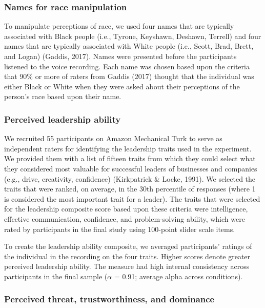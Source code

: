 \documentclass[
  english,
  man, noextraspace,floatsintext]{apa6}
\begin{document}
\hypertarget{names-for-race-manipulation}{%
\subsubsection{Names for race manipulation}\label{names-for-race-manipulation}}

To manipulate perceptions of race, we used four names that are typically associated with Black people (i.e., Tyrone, Keyshawn, Deshawn, Terrell) and four names that are typically associated with White people (i.e., Scott, Brad, Brett, and Logan) (Gaddis, 2017). Names were presented before the participants listened to the voice recording. Each name was chosen based upon the criteria that 90\% or more of raters from Gaddis (2017) thought that the individual was either Black or White when they were asked about their perceptions of the person's race based upon their name.

\hypertarget{perceived-leadership-ability}{%
\subsubsection{Perceived leadership ability}\label{perceived-leadership-ability}}

We recruited 55 participants on Amazon Mechanical Turk to serve as independent raters for identifying the leadership traits used in the experiment. We provided them with a list of fifteen traits from which they could select what they considered most valuable for successful leaders of businesses and companies (e.g., drive, creativity, confidence) (Kirkpatrick \& Locke, 1991). We selected the traits that were ranked, on average, in the 30th percentile of responses (where 1 is considered the most important trait for a leader). The traits that were selected for the leadership composite score based upon these criteria were intelligence, effective communication, confidence, and problem-solving ability, which were rated by participants in the final study using 100-point slider scale items.

To create the leadership ability composite, we averaged participants' ratings of the individual in the recording on the four traits. Higher scores denote greater perceived leadership ability. The measure had high internal consistency across participants in the final sample (\(\alpha\) = 0.91; average alpha across conditions).

\hypertarget{perceived-threat-trustworthiness-and-dominance}{%
\subsubsection{Perceived threat, trustworthiness, and dominance}\label{perceived-threat-trustworthiness-and-dominance}}
\end{document}
